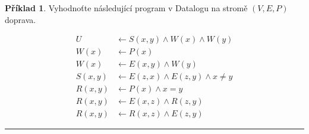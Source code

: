 \documentclass[a4paper]{article}
\theoremstyle{definition}
\newtheorem{priklad}{Příklad}
\begin{document}
\begin{priklad}
    Vyhodnoťte následující program v Datalogu na stromě $ (V,E,P) $ doprava.
    
    \begin{minipage}{0.48\textwidth}
      \begin{align*}
      U &\leftarrow S(x,y)\wedge W(x)\wedge W(y) \\
      W(x) &\leftarrow P(x) \\
      W(x) &\leftarrow E(x,y) \wedge W(y) \\
      S(x,y) &\leftarrow E(z,x)\wedge E(z,y)\wedge x\neq y \\
      R(x,y) &\leftarrow P(x)\wedge x=y \\
      R(x,y) &\leftarrow E(x,z)\wedge R(z,y) \\
      R(x,y) &\leftarrow R(x,z)\wedge E(z,y)
      \end{align*}
    \end{minipage}
    \hfill
    \begin{minipage}{0.3\textwidth}
    \end{minipage}
    
\noindent\rule{\linewidth}{.2pt}    
\end{priklad}

\newpage
\end{document}
